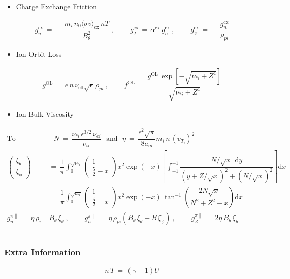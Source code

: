 \documentclass[a4paper,10pt]{article}
\providecommand{\tightlist}{%
  \setlength{\itemsep}{0pt}\setlength{\parskip}{0pt}}
\begin{document}
\begin{itemize}
\tightlist
\item
  Charge Exchange Friction
\end{itemize}

\begin{align}
    g_n^\text{cx} \,=\, -\dfrac{m_i \,n_0 \langle\sigma v\rangle_\text{cx} \,n T}{B_\theta^2}~,~~~~~~~~~~ g_T^\text{cx} \,=\, \alpha^\text{cx}\,g_n^\text{cx}~,~~~~~~~~~~ g_Z^\text{cx} \,=\, -\dfrac{g_n^\text{cx}}{\rho_{pi}}
\end{align}

\begin{itemize}
\tightlist
\item
  Ion Orbit Loss
\end{itemize}

\begin{align}
    g^\text{OL} \,=\, e \,n\, \nu_\text{eff} \sqrt{\epsilon} \,\rho_{pi}~,~~~~~~~~~~ f^\text{OL} \,=\, \dfrac{g^\text{OL}\,\exp\left[-\sqrt{\nu_{*i} + Z^4}\right]}{\sqrt{\nu_{*i} + Z^4}}
\end{align}

\begin{itemize}
\tightlist
\item
  Ion Bulk Viscosity
\end{itemize}

\begin{align}
    \text{To consolidate:}&~~~ N \,=\, \dfrac{\nu_{*i}\,\epsilon^{3/2}\,\nu_{ei}}{\nu_{ii}} ~~~\text{and}~~~ \eta \,=\, \dfrac{\epsilon^2 \sqrt{\pi}}{8 a_m} m_i \,n\, (v_{T_i})^2 \\
    \begin{pmatrix}\xi_\theta \\[1ex] \xi_\phi \end{pmatrix} \,&=\, \dfrac{1}{\pi} \int_0^{\sqrt{\nu_{*i}}} \begin{pmatrix} 1 \\ \frac{5}{2} - x \end{pmatrix} x^2 \exp(-x) \left[\int_{-1}^{+1} \dfrac{N / \sqrt{x} ~~ \text{d}y}{\left(y + Z / \sqrt{x}\right)^2 + \left(N / \sqrt{x}\right)^2}\right] \text{d}x \\
    &=\, \dfrac{1}{\pi} \int_0^{\sqrt{\nu_{*i}}} \begin{pmatrix} 1 \\ \frac{5}{2} - x \end{pmatrix} x^2 \exp(-x) \, \tan^{-1}\left(\dfrac{2 N \sqrt{x}}{N^2 + Z^2 - x}\right) \text{d}x \\
    g_n^{\pi\parallel} \,=\, \eta \, \rho_{\pi}& B_\theta \, \xi_\theta~,~~~~~~~~~~ g_n^{\pi\parallel} \,=\, \eta \, \rho_{pi} \left(B_\theta\,\xi_\theta - B\,\xi_\phi\right)~,~~~~~~~~~~ g_Z^{\pi\parallel} \,=\, 2\eta \, B_\theta \, \xi_\theta 
\end{align}

\begin{center}\rule{0.5\linewidth}{\linethickness}\end{center}

\subsubsection{Extra Information}\label{extra-information}

\begin{align}
    n\,T \,=\, \left(\gamma - 1\right)U
\end{align}
\end{document}
